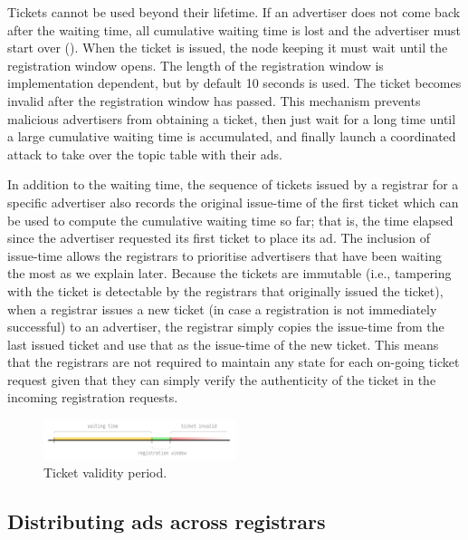 Tickets cannot be used beyond their lifetime. If an advertiser does not come back after the waiting time, all cumulative waiting time is lost and the advertiser must start over (). When the ticket is issued, the node keeping it must wait until the registration window opens. The length of the registration window is implementation dependent, but by default 10 seconds is used. The ticket becomes invalid after the registration window has passed. This mechanism prevents malicious advertisers from obtaining a ticket, then just wait for a long time until a large cumulative waiting time is accumulated, and finally launch a coordinated attack to take over the topic table with their ads.

In addition to the waiting time,  the sequence of tickets issued by a registrar for a specific advertiser also records the original issue-time of the first ticket which can be used to compute the cumulative waiting time so far; that is, the time elapsed since the advertiser requested its first ticket to place its ad. The inclusion of issue-time allows the registrars to prioritise advertisers that have been waiting the most as we explain later. Because the tickets are immutable (i.e., tampering with the ticket is detectable by the registrars that originally issued the ticket), when a registrar issues a new ticket (in case a registration is not immediately successful) to an advertiser, the registrar simply copies the issue-time from the last issued ticket and use that as the issue-time of the new ticket. This means that the registrars are not required to maintain any state for each on-going ticket request given that they can simply verify the authenticity of the ticket in the incoming registration requests. 

    
\begin{figure}
    \includegraphics[width=0.5\textwidth]{img/ticket-validity}
    \caption{Ticket validity period.}
    \label{fig:ticket_validity}
\end{figure}

\subsection{Distributing ads across registrars}\label{sec:registration_multi}


